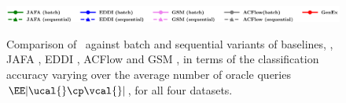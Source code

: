 \documentclass[letterpaper]{article}
\renewcommand{\cite}{\citep}
\begin{document}
\begin{figure}[!h]
    \centering
    \includegraphics[width=0.8\linewidth]{FIG/legend_full.pdf}\\
 \hspace{0.5mm}
\hspace{0.5mm}
\hspace{0.5mm}
\vspace{-1mm}
\caption{Comparison  of \our\ against batch and sequential variants of baselines, \ie, JAFA \cite{jafa}, EDDI \cite{eddi}, ACFlow \cite{acflow} and GSM \cite{gsm}, in terms of the classification accuracy varying over the average number of oracle queries $\EE|\ucal{} \cp \vcal{}|$, for all four datasets.}\vspace{-1mm}
\label{fig:main_full}
\end{figure}
\end{document}
